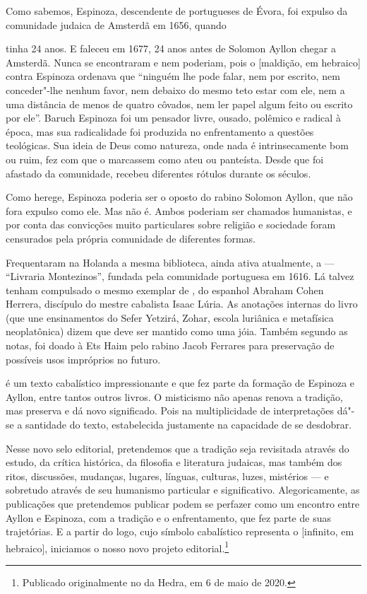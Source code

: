 \begin{multicols}{2}
Como sabemos, Espinoza, descendente de portugueses de Évora, foi expulso da comunidade judaica de Amsterdã em 1656, quando \begin{figure}\end{figure}tinha 24 anos. E faleceu em 1677, 24 anos antes de Solomon Ayllon chegar a Amsterdã. Nunca se encontraram e nem poderiam, pois o {} [maldição, em hebraico] contra Espinoza ordenava que ``ninguém lhe pode falar, nem por escrito, nem conceder"-lhe nenhum favor, nem debaixo do mesmo teto estar com ele, nem a uma distância de menos de quatro côvados, nem ler papel algum feito ou escrito por ele''. Baruch Espinoza foi um pensador livre, ousado, polêmico e radical à época, mas sua radicalidade foi produzida no enfrentamento a questões teológicas. Sua ideia de Deus como natureza, onde nada é intrinsecamente bom ou ruim, fez com que o marcassem como ateu ou panteísta. Desde que foi afastado da comunidade, recebeu diferentes rótulos durante os séculos. 

Como herege, Espinoza poderia ser o oposto do rabino Solomon Ayllon, que não fora expulso como ele. Mas não é. Ambos poderiam ser chamados humanistas, e por conta das convicções muito particulares sobre religião e sociedade foram censurados pela própria comunidade de diferentes formas. 

Frequentaram na Holanda a mesma biblioteca, ainda ativa atualmente, a {} --- ``Livraria Montezinos'', fundada pela comunidade portuguesa em 1616. Lá talvez tenham compulsado o mesmo exemplar de {}, do espanhol Abraham Cohen Herrera, discípulo do mestre cabalista Isaac Lúria. As anotações internas do livro (que une ensinamentos do Sefer Yetzirá, Zohar, escola luriânica e metafísica neoplatônica) dizem que deve ser mantido como uma jóia. Também segundo as notas, foi doado à Ets Haim pelo rabino Jacob Ferrares para preservação de possíveis usos impróprios no futuro. 

{} é um texto cabalístico impressionante e que fez parte da formação de Espinoza e Ayllon, entre tantos outros livros. O misticismo não apenas renova a tradição, mas preserva e dá novo significado. Pois na multiplicidade de interpretações dá"-se a santidade do texto, estabelecida justamente na capacidade de se desdobrar.

Nesse novo selo editorial, pretendemos que a tradição seja revisitada através do estudo, da crítica histórica, da filosofia e literatura judaicas, mas também dos ritos, discussões, mudanças, lugares, línguas, culturas, luzes, mistérios --- e sobretudo através de seu humanismo particular e significativo. Alegoricamente, as publicações que pretendemos publicar podem se perfazer como um encontro entre Ayllon e Espinoza, com a tradição e o enfrentamento, que fez parte de suas trajetórias. E a partir do logo, cujo símbolo cabalístico representa o {} [infinito, em hebraico], iniciamos o nosso novo projeto editorial.\footnote[1]{Publicado originalmente no {} da Hedra, em 6 de maio de 2020.}
\end{multicols}

\pagebreak
